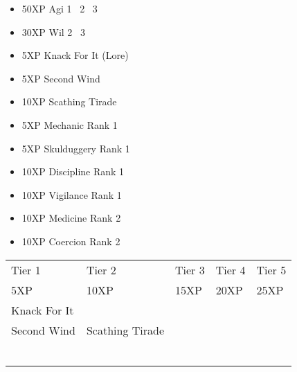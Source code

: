 \documentclass{article}
\begin{document}




\begin{multicols}{2}
\setlength{\columnseprule}{0.3pt}
\begin{itemize}[noitemsep]
\item 50XP Agi 1 \faArrowRight\ 2 \faArrowRight\ 3
\item 30XP Wil 2 \faArrowRight\ 3
\item 5XP Knack For It (Lore)
\item 5XP Second Wind
\item 10XP Scathing Tirade
\item 5XP Mechanic Rank 1
\item 5XP Skulduggery Rank 1
\item 10XP Discipline Rank 1
\item 10XP Vigilance Rank 1
\item 10XP Medicine Rank 2
\item 10XP Coercion Rank 2
\end{itemize}
\end{multicols}


\vspace*{\fill}

\hfill{}


\pagebreak


\noindent\begin{tabu} to 
\rowfont{\bfseries\sffamily\centering} Tier 1 & Tier 2 & Tier 3 & Tier 4 & Tier 5\\
\rowfont{\small\sffamily\centering} 5XP & 10XP & 15XP & 20XP & 25XP\\
Knack For It\\
Second Wind & Scathing Tirade \\
 &  & \\
 &  & & \\
 &  & & & \\
 &  & & & \\
 &  & & & \\
 &  & & & \\

\end{tabu}
\end{document}
